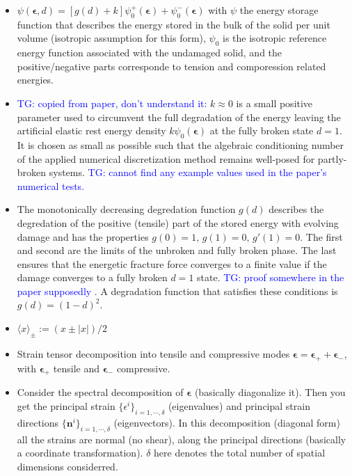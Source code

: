 \documentclass[11pt,a4paper]{article}
\newcommand{\tg}[1]{\textcolor{blue}{TG: #1} }
\newcommand{\bb}[1]{\boldsymbol{#1}}
\begin{document}
\begin{itemize}
\item $\psi(\bb{\epsilon},d) = [g(d) + k] \psi_0^+(\bb{\epsilon}) + \psi_0^-(\bb{\epsilon})$ 
with $\psi$ the energy storage function that describes the energy stored in the bulk of the solid per unit volume (isotropic assumption for this form), $\psi_0$ is the isotropic reference energy function associated with the undamaged solid, and the positive/negative parts corresponde to tension and comporession related energies.

\item 
\tg{copied from paper, don't understand it:}
$k \approx 0 $ is a small positive parameter used to circumvent the full degradation of the energy leaving the artificial elastic rest energy density $k \psi_0(\bb{\epsilon})$ at the fully broken state $d=1$. It is chosen as small as possible such that the algebraic conditioning number of the applied numerical discretization method remains well-posed for partly-broken systems.
\tg{cannot find any example values used in the paper's numerical tests.}

\item The monotonically decreasing degredation function $g(d)$ describes the degredation of the positive (tensile) part of the stored energy with evolving damage and has the properties
$g(0)=1, \, g(1)=0, \, g'(1)=0$. The first and second are the limits of the unbroken and fully broken phase. The last ensures that the energetic fracture force converges to a finite value if the damage converges to a fully broken $d=1$ state. \tg{proof somewhere in the paper supposedly}. A degradation function that satisfies these conditions is $g(d) = (1-d)^2$.

\item $\langle x \rangle_{\pm} := (x \pm |x|)/2$

\item Strain tensor decomposition into tensile and compressive modes $\bb{\epsilon} = \bb{\epsilon}_+ + \bb{\epsilon}_-$, with $\bb{\epsilon}_+$ tensile and $\bb{\epsilon}_-$ compressive.

\item Consider the spectral decomposition of $\bb{\epsilon}$ (basically diagonalize it). Then you get the principal strain $\{\epsilon^i\}_{i=1,\cdots,\delta}$ (eigenvalues) and principal strain directions $\{\mathbf{n}^i\}_{i=1,\cdots,\delta}$ (eigenvectors). In this decomposition (diagonal form) all the strains are normal (no shear), along the principal directions (basically a coordinate transformation). $\delta$ here denotes the total number of spatial dimensions considerred.


\end{itemize}
\end{document}
